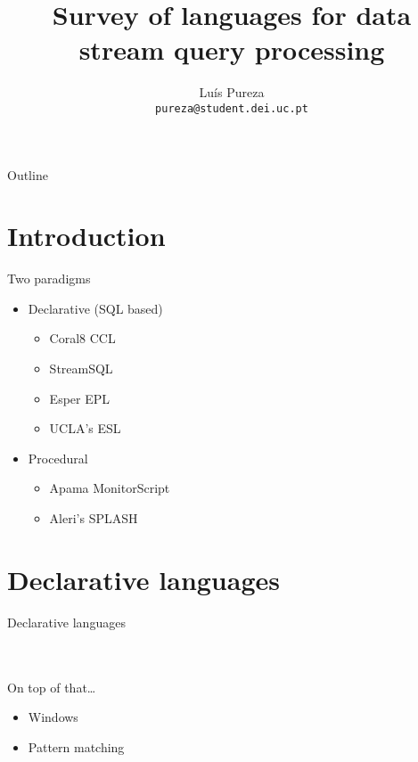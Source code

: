 \documentclass[brown, compress, mathserif]{beamer}
\title{Survey of languages for data stream query processing}
\author{Lu\'{i}s Pureza \\ \texttt{pureza@student.dei.uc.pt}}
\institute[University of Coimbra]
{
  Department of Informatics Engineering\\
  University of Coimbra, Portugal
}
\begin{document}
\begin{frame}
  \titlepage
\end{frame}

\begin{frame}{Outline}
  \tableofcontents
\end{frame}

\section{Introduction}

\begin{frame}{Two paradigms}
  \begin{itemize}
  \item Declarative (SQL based)
    \begin{itemize}
    \item Coral8 CCL
    \item StreamSQL
    \item Esper EPL
    \item UCLA's ESL
    \end{itemize}
  \item Procedural
    \begin{itemize}
    \item Apama MonitorScript
    \item Aleri's SPLASH
    \end{itemize}
  \end{itemize}
\end{frame}

\section{Declarative languages}

\begin{frame}{Declarative languages}
  \hlstd{}\hspace*{\fill}\\
  \hspace*{\fill}\\
  \hlsym{= }\hlstd{}\hlstd{}\hspace*{\fill}\\
\end{frame}


\begin{frame}{On top of that\ldots}
  \begin{itemize}
  \item Windows
  \item Pattern matching
  \end{itemize}
\end{frame}
\end{document}
